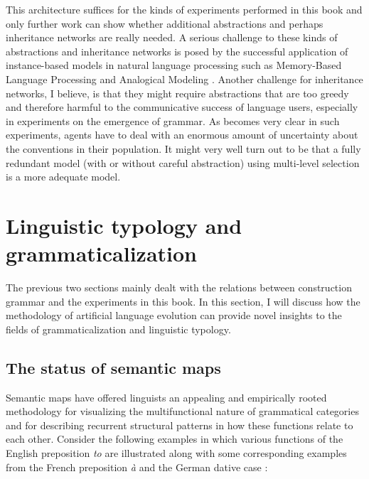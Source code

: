 This architecture suffices for the kinds of experiments performed in this book and only further work can show whether additional abstractions and perhaps inheritance networks are really needed. A serious challenge to these kinds of abstractions and inheritance networks is posed by the successful application of instance-based models in natural language processing such as Memory-Based Language Processing \citep{daelemans05memory} and Analogical Modeling \citep{skousen89analogical}. Another challenge for inheritance networks, I believe, is that they might require abstractions that are too greedy and therefore harmful to the communicative success of language users, especially in experiments on the emergence of grammar. As becomes very clear in such experiments, agents have to deal with an enormous amount of uncertainty about the conventions in their population. It might very well turn out to be that a fully redundant model (with or without careful abstraction) using multi-level selection is a more adequate model.

\section{Linguistic typology and grammaticalization}
\label{s:comp-semmaps}

The previous two sections mainly dealt with the relations between construction grammar and the experiments in this book. In this section, I will discuss how the methodology of artificial language evolution can provide novel insights to the fields of grammaticalization and linguistic typology.

\subsection{The status of semantic maps}
\label{s:semantic-maps}

Semantic maps have offered linguists an appealing and empirically rooted methodology for visualizing the multifunctional nature of grammatical categories and for describing recurrent structural patterns in how these functions relate to each other. Consider the following examples in which various functions of the English preposition {\em to} are illustrated along with some corresponding examples from the French preposition {\em \`{a}} and the German dative case \citep[taken from][example 2, p. 212 and example sentences on p. 213--215]{haspelmath03geometry}:

